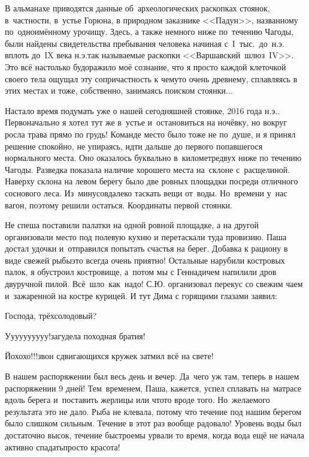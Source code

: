 В альманахе \cite{ЧагодаАльманахБашенькин} приводятся данные об~археологических раскопках стоянок, в~частности, в~устье Горюна, в природном заказнике <<Падун>>, названному по~одноимённому урочищу. Здесь, а также немного ниже по~течению Чагоды, были найдены свидетельства пребывания человека начиная с~I~тыс.~до~н.э. вплоть до~IX века н.э.\mdash так называемые раскопки <<Варшавский~шлюз~I\nbdash V>>. Это всё настолько будоражило моё сознание, что я просто каждой клеточкой своего тела ощущал эту сопричастность к чему\sdash то очень древнему, сплавляясь в этих местах и тоже, собственно, занимаясь поиском стоянки$\ldots$

Настало время подумать уже о нашей сегодняшней стоянке, 2016 года н.э.. Первоначально я хотел тут же в~устье и~остановиться на ночёвку, но вокруг росла трава прямо по грудь! Команде место было тоже не по~душе, и я принял решение спокойно, не упираясь, идти дальше до первого попавшегося нормального места. Оно оказалось буквально в~километре\sdash двух ниже по течению Чагоды. Разведка показала наличие хорошего места на~склоне с~расщелиной. Наверху склона на левом берегу было две ровных площадки посреди отличного соснового леса. Из~минусов\mdash далеко таскать вещи от~воды. Но~времени у~нас вагон, поэтому решили остаться. Координаты первой стоянки\mdash \CoordsChagodaSixteenFirst.

Не спеша поставили палатки на одной ровной площадке, а на другой организовали место под полевую кухню и перетаскали туда провизию. Паша достал удочки и~отправился попытать счастья на берег. Добавка к рациону в виде свежей рыбы\mdash это всегда очень приятно! Остальные нарубили костровых палок, я обустроил костровище, а~потом мы с Геннадичем напилили дров двуручной пилой. Всё~шло~как~надо! С.Ю. организовал перекус со свежим чаем и~зажаренной на костре курицей. И тут Дима с горящими глазами заявил:

\diagdash Господа, трёхсолодовый?

\diagdash У\sdash у\sdash у\sdash у\sdash у\sdash у\sdash у\sdash у\sdash у\sdash у!\mdash загудела походная братия! 

\diagdash Йо\sdash хо\sdash хо!!!\mdash звон сдвигающихся кружек затмил всё на свете! 

В нашем распоряжении был весь день и вечер. Да~чего уж там, теперь в нашем распоряжении 9\thinspace\nbdash{} дней! Тем~временем, Паша, кажется, успел сплавать на~матрасе вдоль берега и~поставить жерлицы или что\sdash то вроде того. Но~желаемого результата это не дало. Рыба не клевала, потому что течение под нашим берегом было слишком сильным. Течение в этот раз вообще радовало! Уровень воды был достаточно высок, течение быстрое\mdash мы урвали то время, когда вода ещё не начала активно спадать\mdash просто кра\sdash со\sdash та!
 

